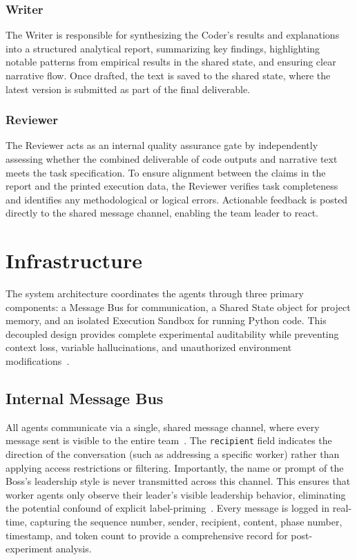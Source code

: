 \subsubsection{Writer}
\label{subsubsec:writer}

The Writer is responsible for synthesizing the Coder's results and explanations into a structured analytical report, summarizing key findings, highlighting notable patterns from empirical results in the shared state, and ensuring clear narrative flow.
Once drafted, the text is saved to the shared state, where the latest version is submitted as part of the final deliverable.

\subsubsection{Reviewer}
\label{subsubsec:reviewer}

The Reviewer acts as an internal quality assurance gate by independently assessing whether the combined deliverable of code outputs and narrative text meets the task specification.
To ensure alignment between the claims in the report and the printed execution data, the Reviewer verifies task completeness and identifies any methodological or logical errors.
Actionable feedback is posted directly to the shared message channel, enabling the team leader to react. 

\section{Infrastructure}
\label{sec:infrastructure}

The system architecture coordinates the agents through three primary components: a Message Bus for communication, a Shared State object for project memory, and an isolated Execution Sandbox for running Python code.
This decoupled design provides complete experimental auditability while preventing context loss, variable hallucinations, and unauthorized environment modifications~\cite{guo2024largelanguagemodelbased}.

\subsection{Internal Message Bus}
\label{subsec:internal-message-bus}

All agents communicate via a single, shared message channel, where every message sent is visible to the entire team~\cite{hong2024metagptmetaprogrammingmultiagent}.
The \texttt{recipient} field indicates the direction of the conversation (such as addressing a specific worker) rather than applying access restrictions or filtering.
Importantly, the name or prompt of the Boss's leadership style is never transmitted across this channel. 
This ensures that worker agents only observe their leader's visible leadership behavior, eliminating the potential confound of explicit label-priming~\cite{jiang2024personallminvestigatingabilitylarge, salewski2023incontextimpersonationrevealslarge}.
Every message is logged in real-time, capturing the sequence number, sender, recipient, content, phase number, timestamp, and token count to provide a comprehensive record for post-experiment analysis.

